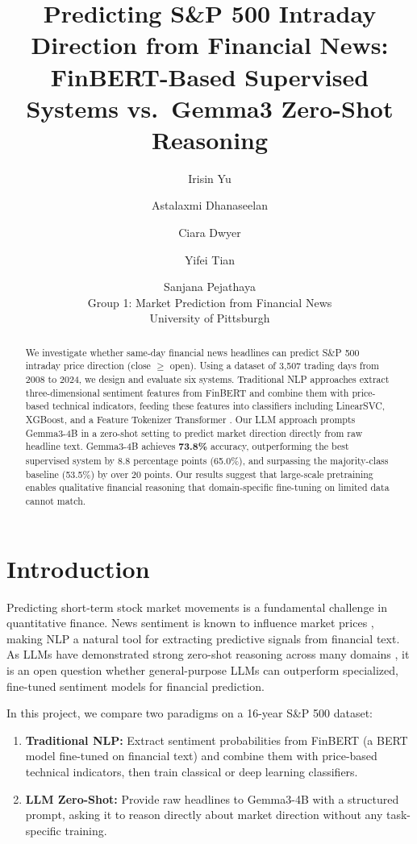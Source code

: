\documentclass[11pt]{article}
\title{Predicting S\&P 500 Intraday Direction from Financial News:\\
FinBERT-Based Supervised Systems vs.\ Gemma3 Zero-Shot Reasoning}
\author{Irisin Yu \and Astalaxmi Dhanaseelan \and Ciara Dwyer \and Yifei Tian \and Sanjana Pejathaya \\
  Group 1: Market Prediction from Financial News \\
  University of Pittsburgh}
\begin{document}
\maketitle

\begin{abstract}
We investigate whether same-day financial news headlines can predict S\&P 500 intraday price direction (close $\geq$ open). Using a dataset of 3,507 trading days from 2008 to 2024, we design and evaluate six systems. Traditional NLP approaches extract three-dimensional sentiment features from FinBERT \citep{araci2019finbert} and combine them with price-based technical indicators, feeding these features into classifiers including LinearSVC, XGBoost, and a Feature Tokenizer Transformer \citep{gorishniy2021revisiting}. Our LLM approach prompts Gemma3-4B \citep{gemma2025} in a zero-shot setting to predict market direction directly from raw headline text. Gemma3-4B achieves \textbf{73.8\%} accuracy, outperforming the best supervised system by 8.8 percentage points (65.0\%), and surpassing the majority-class baseline (53.5\%) by over 20 points. Our results suggest that large-scale pretraining enables qualitative financial reasoning that domain-specific fine-tuning on limited data cannot match.
\end{abstract}

\section{Introduction}

Predicting short-term stock market movements is a fundamental challenge in quantitative finance. News sentiment is known to influence market prices \citep{loughran2011liability}, making NLP a natural tool for extracting predictive signals from financial text. As LLMs have demonstrated strong zero-shot reasoning across many domains \citep{brown2020gpt3}, it is an open question whether general-purpose LLMs can outperform specialized, fine-tuned sentiment models for financial prediction.

In this project, we compare two paradigms on a 16-year S\&P 500 dataset:
\begin{enumerate}
  \item \textbf{Traditional NLP:} Extract sentiment probabilities from FinBERT (a BERT model fine-tuned on financial text) and combine them with price-based technical indicators, then train classical or deep learning classifiers.
  \item \textbf{LLM Zero-Shot:} Provide raw headlines to Gemma3-4B with a structured prompt, asking it to reason directly about market direction without any task-specific training.
\end{enumerate}
\end{document}
